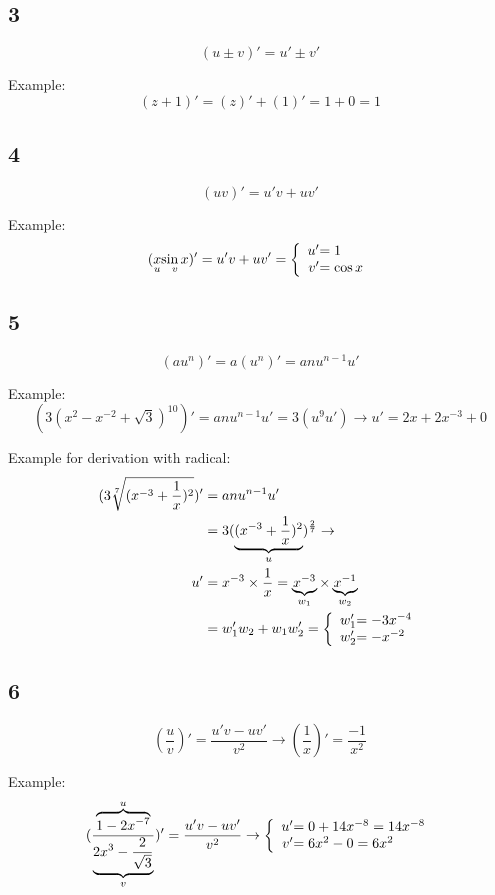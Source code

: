 \subsection{3}
\[ (u \pm v)' = u' \pm v' \]

Example:
\[ (z + 1)' = (z)' + (1)' = 1 + 0 = 1 \]

\subsection{4}
\[ (uv)' = u'v + uv' \]

Example:
\begin{align*}
(\underset{u}{x}\underset{v}{\sin x})' = u'v + uv' = 
\left\lbrace
\begin{array}{r@{}l}
	u' &= 1 \\
	v' &= \cos x
\end{array}
\right.
\end{align*}

\subsection{5}
\[ (au^n)' = a(u^n)' = anu^{n-1}u' \]

Example:
\[ (3(x^2-x^{-2}+\sqrt{3})^{10})' = anu^{n-1}u' = 3(u^9u') \to u' = 2x +2x^{-3} + 0 \]

Example for derivation with radical:
\begin{align*}
(3\sqrt[7]{(x^{-3}+\frac{1}{x})^2})' &= anu^{n-1}u' \\
&= 3(\underbrace{(x^{-3}+\frac{1}{x})^2}_u)^{\frac{2}{7}} \to \\
u' &= x^{-3}\times\frac{1}{x} =
\underbrace{x^{-3}}_{w_1} \times \underbrace{x^{-1}}_{w_2} \\
&= w_1'w_2+w_1w_2' = 
\left\lbrace
\begin{array}{r@{}l}
	w_1' &= -3x^{-4} \\
	w_2' &= -x^{-2}
\end{array}
\right.
\end{align*}

\subsection{6}
\[ (\frac{u}{v})' = \frac{u'v - uv'}{v^2} \to (\frac{1}{x})' = \frac{-1}{x^2} \]

Example:
\begin{align*}
(\frac{\overbrace{1-2x^{-7}}^u}{\underbrace{2x^3-\frac{2}{\sqrt{3}}}_v})' = \frac{u'v - uv'}{v^2} \to
\left\lbrace
\begin{array}{r@{}l}
	u' &= 0 + 14x^{-8} = 14x^{-8} \\
	v' &= 6x^2-0 = 6x^2
\end{array}
\right.
\end{align*}


